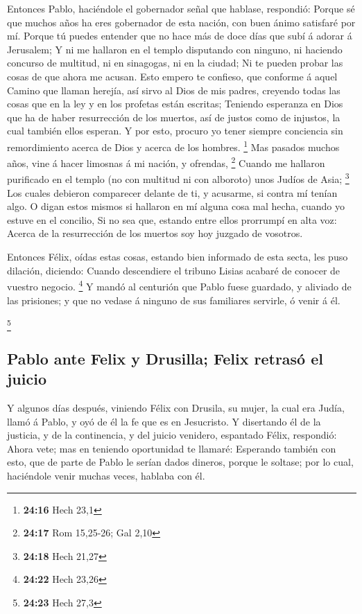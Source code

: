  Entonces Pablo, haciéndole el gobernador señal que
hablase, respondió: Porque sé que muchos años ha eres gobernador de esta
nación, con buen ánimo satisfaré por mí.  Porque tú
puedes entender que no hace más de doce días que subí á adorar á
Jerusalem;  Y ni me hallaron en el templo disputando con
ninguno, ni haciendo concurso de multitud, ni en sinagogas, ni en la
ciudad;  Ni te pueden probar las cosas de que ahora me
acusan.  Esto empero te confieso, que conforme á aquel
Camino que llaman herejía, así sirvo al Dios de mis padres, creyendo
todas las cosas que en la ley y en los profetas están escritas;
 Teniendo esperanza en Dios que ha de haber resurrección
de los muertos, así de justos como de injustos, la cual también ellos
esperan.  Y por esto, procuro yo tener siempre conciencia
sin remordimiento acerca de Dios y acerca de los hombres. \footnote{\textbf{24:16}
  Hech 23,1}  Mas pasados muchos años, vine á hacer
limosnas á mi nación, y ofrendas, \footnote{\textbf{24:17} Rom 15,25-26;
  Gal 2,10}  Cuando me hallaron purificado en el templo
(no con multitud ni con alboroto) unos Judíos de Asia; \footnote{\textbf{24:18}
  Hech 21,27}  Los cuales debieron comparecer delante de
ti, y acusarme, si contra mí tenían algo.  O digan estos
mismos si hallaron en mí alguna cosa mal hecha, cuando yo estuve en el
concilio,  Si no sea que, estando entre ellos prorrumpí
en alta voz: Acerca de la resurrección de los muertos soy hoy juzgado de
vosotros.

 Entonces Félix, oídas estas cosas, estando bien
informado de esta secta, les puso dilación, diciendo: Cuando descendiere
el tribuno Lisias acabaré de conocer de vuestro negocio. \footnote{\textbf{24:22}
  Hech 23,26}  Y mandó al centurión que Pablo fuese
guardado, y aliviado de las prisiones; y que no vedase á ninguno de sus
familiares servirle, ó venir á él.

\footnote{\textbf{24:23} Hech 27,3}

\hypertarget{pablo-ante-felix-y-drusilla-felix-retrasuxf3-el-juicio}{%
\subsection{Pablo ante Felix y Drusilla; Felix retrasó el
juicio}\label{pablo-ante-felix-y-drusilla-felix-retrasuxf3-el-juicio}}

 Y algunos días después, viniendo Félix con Drusila, su
mujer, la cual era Judía, llamó á Pablo, y oyó de él la fe que es en
Jesucristo.  Y disertando él de la justicia, y de la
continencia, y del juicio venidero, espantado Félix, respondió: Ahora
vete; mas en teniendo oportunidad te llamaré:  Esperando
también con esto, que de parte de Pablo le serían dados dineros, porque
le soltase; por lo cual, haciéndole venir muchas veces, hablaba con él.

